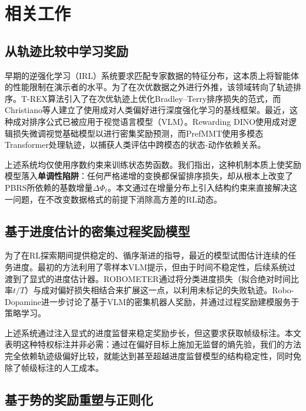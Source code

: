 \clearpage
\section{相关工作}

\subsection{从轨迹比较中学习奖励}

早期的逆强化学习（IRL）系统要求匹配专家数据的特征分布，这本质上将智能体的性能限制在演示者的水平\cite{ziebart2008}。为了在次优数据之外进行外推，该领域转向了轨迹排序。T-REX算法\cite{brown2019}引入了在次优轨迹上优化Bradley--Terry排序损失\cite{bradley1952}的范式，而Christiano等人\cite{christiano2017}建立了使用成对人类偏好进行深度强化学习的基线框架。最近，这种成对排序公式已被应用于视觉语言模型（VLM）。Rewarding DINO\cite{krack2026}使用成对逻辑损失微调视觉基础模型以进行密集奖励预测，而PrefMMT\cite{zhao2025}使用多模态Transformer处理轨迹，以捕获人类评估中跨模态的状态-动作依赖关系。

上述系统均仅使用序数约束来训练状态势函数。我们指出，这种机制本质上使奖励模型落入\textbf{单调性陷阱}：任何严格递增的变换都保留排序损失，却从根本上改变了PBRS所依赖的基数增量$\Delta\Phi_t$。本文通过在增量分布上引入结构约束来直接解决这一问题，在不改变数据格式的前提下消除高方差的RL动态。

\subsection{基于进度估计的密集过程奖励模型}

为了在RL探索期间提供稳定的、循序渐进的指导，最近的模型试图估计连续的任务进度。最初的方法利用了零样本VLM提示，但由于时间不稳定性，后续系统过渡到了显式的进度估计器。ROBOMETER\cite{liang2026}通过将分类进度损失（拟合绝对时间比率$t/T$）与成对偏好损失相结合来扩展这一点，以利用未标记的失败轨迹。Robo-Dopamine\cite{tan2026}进一步讨论了基于VLM的密集机器人奖励，并通过过程奖励建模服务于策略学习。

上述系统通过注入显式的进度监督来稳定奖励步长，但这要求获取帧级标注。本文表明这种特权标注并非必需：通过在偏好目标上施加无监督的熵先验，我们的方法完全依赖轨迹级偏好比较，就能达到甚至超越进度监督模型的结构稳定性，同时免除了帧级标注的人工成本。

\subsection{基于势的奖励重塑与正则化}

